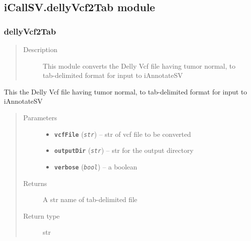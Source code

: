 \documentclass[letterpaper,10pt,english]{sphinxmanual}
\begin{document}
\subsection{iCallSV.dellyVcf2Tab module}
\label{iCallSV:module-iCallSV.dellyVcf2Tab}\label{iCallSV:icallsv-dellyvcf2tab-module}

\subsubsection{dellyVcf2Tab}
\label{iCallSV:dellyvcf2tab}\begin{quote}\begin{description}
\item[{Description}] \leavevmode
This module converts the Delly Vcf file having tumor normal, to tab-delimited format for input to iAnnotateSV

\end{description}\end{quote}

\begin{fulllineitems}
\label{iCallSV:iCallSV.dellyVcf2Tab.vcf2tab}
This  the Delly Vcf file having tumor normal, to tab-delimited format for input to iAnnotateSV
\begin{quote}\begin{description}
\item[{Parameters}] \leavevmode\begin{itemize}
\item {} 
\textbf{\texttt{vcfFile}} (\emph{\texttt{str}}) -- str of vcf file to be converted

\item {} 
\textbf{\texttt{outputDir}} (\emph{\texttt{str}}) -- str for the output directory

\item {} 
\textbf{\texttt{verbose}} (\emph{\texttt{bool}}) -- a boolean

\end{itemize}

\item[{Returns}] \leavevmode
A str name of tab-delimited file

\item[{Return type}] \leavevmode
str

\end{description}\end{quote}

\end{fulllineitems}
\end{document}
